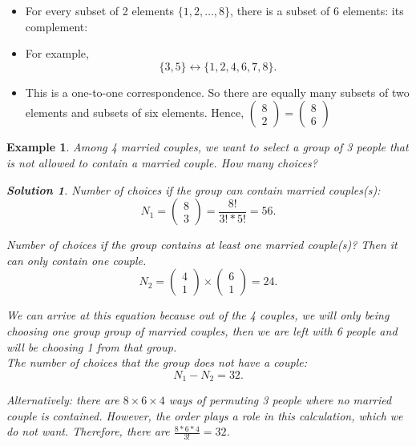 \documentclass[a4paper]{article}
\newcounter{counter}
\numberwithin{counter}{subsection}
\theoremstyle{break}
\newtheorem{exmp}[counter]{Example}
\newtheorem*{solution}{Solution}
\begin{document}
			\begin{itemize}
				\item For every subset of 2 elements $\{1,2,\ldots,8\}$, there is a subset of 6 elements: its complement:
				\item For example, \[
						\{3, 5\} \leftrightarrow \{1,2,4,6,7,8\}  
				.\] 
				\item This is a one-to-one correspondence. So there are equally many subsets of two elements and subsets of six elements. Hence, $\begin{pmatrix} 8 \\ 2 \end{pmatrix} = \begin{pmatrix} 8 \\ 6 \end{pmatrix} $
			\end{itemize}

			\begin{exmp}
				Among 4 married couples, we want to select a group of 3 people that is not allowed to contain a married couple. How many choices?

				\begin{solution}
					Number of choices if the group can contain married couples(s): \[
					N_1 = \begin{pmatrix} 8 \\ 3 \end{pmatrix} = \frac{8!}{3! * 5!} = 56
					.\] 

					Number of choices if the group contains at least one married couple(s)? Then it can only contain one couple. \[
					N_2 = \begin{pmatrix} 4 \\ 1 \end{pmatrix} \times \begin{pmatrix} 6 \\ 1 \end{pmatrix} = 24
					.\] 

					We can arrive at this equation because out of the 4 couples, we will only being choosing one group group of married couples, then we are left with 6 people and will be choosing 1 from that group.\\
					The number of choices that the group does not have a couple: \[
					N_1 - N_2 = 32 
					.\] 

					Alternatively: there are $8 \times 6 \times 4$ ways of permuting 3 people where no married couple is contained. However, the order plays a role in this calculation, which we do not want. Therefore, there are $\frac{8 * 6 * 4}{3!}= 32$.\\
				\end{solution}
			\end{exmp}
\end{document}
